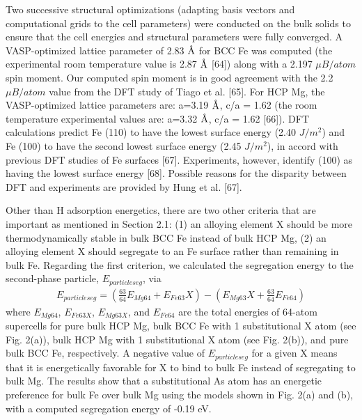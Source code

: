 Two successive structural optimizations (adapting basis vectors and computational grids to the cell parameters) were conducted on the bulk solids to ensure that the cell energies and structural parameters were fully converged. A \ac{VASP}-optimized lattice parameter of 2.83 $\mbox{\normalfont\AA}$ for \ac{BCC} Fe was computed (the experimental room temperature value is 2.87 $\mbox{\normalfont\AA}$ [64]) along with a 2.197 $\mu B/atom$ spin moment. Our computed spin moment is in good agreement with the 2.2 $\mu B/atom$ value from the \ac{DFT} study of Tiago et al. [65]. For \ac{HCP} Mg, the VASP-optimized lattice parameters are: a=3.19 $\mbox{\normalfont\AA}$, c/a = 1.62 (the room temperature experimental values are: a=3.32 $\mbox{\normalfont\AA}$, c/a = 1.62 [66]). DFT calculations predict Fe (110) to have the lowest surface energy (2.40 $J/m^2$) and Fe (100) to have the second lowest surface energy (2.45 $J/m^2$), in accord with previous DFT studies of Fe surfaces [67].  Experiments, however, identify (100) as having the lowest surface energy [68]. Possible reasons for the disparity between DFT and experiments are provided by Hung et al. [67].

Other than H adsorption energetics, there are two other criteria that are important as mentioned in Section 2.1: (1) an alloying element X should be more thermodynamically stable in bulk \ac{BCC} Fe instead of bulk \ac{HCP} Mg, (2) an alloying element X should segregate to an Fe surface rather than remaining in bulk Fe. Regarding the first criterion, we calculated the segregation energy to the second-phase particle, $E_{particle seg}$, via
\begin{align}
 E_{particle seg} = (\frac{63}{64}E_{Mg64} + E_{Fe63}X) - (E_{Mg63}X + \frac{63}{64}E_{Fe64})
 \label{Chap:Mg_H:eq:particle_seg}
\end{align}
where $E_{Mg64}$, $E_{Fe63X}$, $E_{Mg63X}$, and $E_{Fe64}$ are the total energies of 64-atom supercells for pure bulk HCP Mg, bulk \ac{BCC} Fe with 1 substitutional X atom (see Fig. 2(a)), bulk HCP Mg with 1 substitutional X atom (see Fig. 2(b)), and pure bulk \ac{BCC} Fe, respectively. A negative value of $E_{particle seg}$ for a given X means that it is energetically favorable for X to bind to bulk Fe instead of segregating to bulk Mg. The results show that a substitutional As atom has an energetic preference for bulk Fe over bulk Mg using the models shown in Fig. 2(a) and (b), with a computed segregation energy of -0.19 eV.

